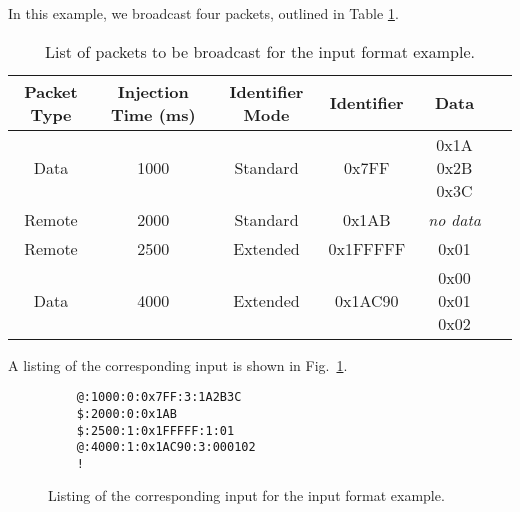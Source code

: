 In this example, we broadcast four packets, outlined in Table \ref{table:candt_packet_example}.

\begin{table}[H]
\caption{List of packets to be broadcast for the input format example.}
\centering
\begin{tabular}{|c|c|c|c|c|c|}
	\hline 
	Packet Type & Injection Time (ms) & Identifier Mode & Identifier &	 Data \\
	\hline
	\hline
	Data & 1000 & Standard & 0x7FF & 0x1A 0x2B 0x3C \\
	\hline
	Remote & 2000 & Standard & 0x1AB & \emph{no data} \\
	\hline
	Remote & 2500 & Extended & 0x1FFFFF & 0x01 \\
	\hline
	Data & 4000 & Extended & 0x1AC90 & 0x00 0x01 0x02 \\
	\hline
\end{tabular}
\label{table:candt_packet_example}
\end{table}

A listing of the corresponding input is shown in Fig.\ \ref{fig:candt_packet_example}.

\begin{figure}[H]
	\centering
	\makebox[\textwidth]{\hrulefill}
	\begin{verbatim}
	@:1000:0:0x7FF:3:1A2B3C
	$:2000:0:0x1AB
	$:2500:1:0x1FFFFF:1:01
	@:4000:1:0x1AC90:3:000102
	!
	\end{verbatim}
	\makebox[\textwidth]{\hrulefill}
	\caption{Listing of the corresponding input for the input format example.}
	\label{fig:candt_packet_example}
\end{figure}
